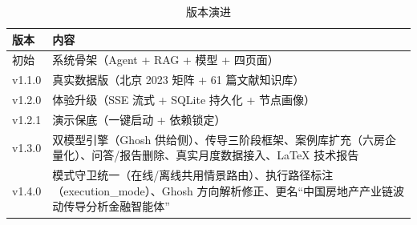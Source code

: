 \documentclass[12pt, a4paper]{ctexart}
\begin{document}
\begin{table}[htbp]
\centering
\caption{版本演进}
\begin{tabular}{@{}p{2cm}p{12.5cm}@{}}
\toprule
版本 & 内容 \\
\midrule
初始 & 系统骨架（Agent + RAG + 模型 + 四页面） \\
v1.1.0 & 真实数据版（北京 2023 矩阵 + 61 篇文献知识库） \\
v1.2.0 & 体验升级（SSE 流式 + SQLite 持久化 + 节点画像） \\
v1.2.1 & 演示保底（一键启动 + 依赖锁定） \\
v1.3.0 & 双模型引擎（Ghosh 供给侧）、传导三阶段框架、案例库扩充（六房企量化）、问答/报告删除、真实月度数据接入、LaTeX 技术报告 \\
v1.4.0 & 模式守卫统一（在线/离线共用情景路由）、执行路径标注（execution\_mode）、Ghosh 方向解析修正、更名“中国房地产产业链波动传导分析金融智能体” \\
\bottomrule
\end{tabular}
\end{table}
\end{document}
